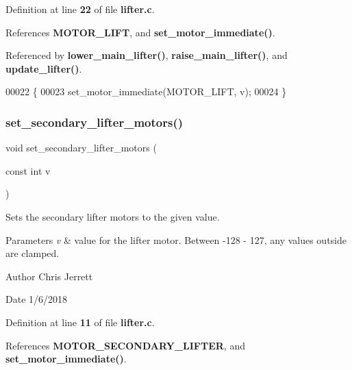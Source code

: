 Definition at line \textbf{ 22} of file \textbf{ lifter.\+c}.



References \textbf{ M\+O\+T\+O\+R\+\_\+\+L\+I\+FT}, and \textbf{ set\+\_\+motor\+\_\+immediate()}.



Referenced by \textbf{ lower\+\_\+main\+\_\+lifter()}, \textbf{ raise\+\_\+main\+\_\+lifter()}, and \textbf{ update\+\_\+lifter()}.


\begin{DoxyCode}
00022                                          \{
00023   set_motor_immediate(MOTOR_LIFT, v);
00024 \}
\end{DoxyCode}
\mbox{\label{lifter_8c_a78640d547d9361951a92d0bc00939536}} 
\subsubsection{set\+\_\+secondary\+\_\+lifter\+\_\+motors()}
{\footnotesize\ttfamily void set\+\_\+secondary\+\_\+lifter\+\_\+motors (\begin{DoxyParamCaption}\item[{const int}]{v }\end{DoxyParamCaption})}



Sets the secondary lifter motors to the given value. 


\begin{DoxyParams}{Parameters}
{\em v} & value for the lifter motor. Between -\/128 -\/ 127, any values outside are clamped. \\
\hline
\end{DoxyParams}
\begin{DoxyAuthor}{Author}
Chris Jerrett 
\end{DoxyAuthor}
\begin{DoxyDate}{Date}
1/6/2018 
\end{DoxyDate}


Definition at line \textbf{ 11} of file \textbf{ lifter.\+c}.



References \textbf{ M\+O\+T\+O\+R\+\_\+\+S\+E\+C\+O\+N\+D\+A\+R\+Y\+\_\+\+L\+I\+F\+T\+ER}, and \textbf{ set\+\_\+motor\+\_\+immediate()}.



